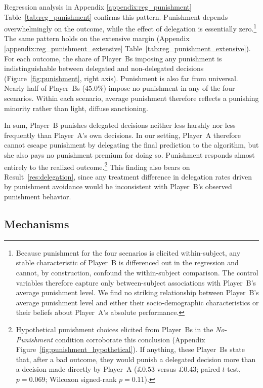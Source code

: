Regression analysis in Appendix \ref{appendix:reg_punishment} Table~\ref{tab:reg_punishment} confirms this pattern. Punishment depends overwhelmingly on the outcome, while the effect of delegation is essentially zero.\footnote{Because punishment for the four scenarios is elicited within-subject, any stable characteristic of Player~B is differenced out in the regression and cannot, by construction, confound the within-subject comparison. The control variables therefore capture only between-subject associations with Player~B's average punishment level. We find no striking relationship between Player~B's average punishment level and either their socio-demographic characteristics or their beliefs about Player~A's absolute performance.} The same pattern holds on the extensive margin (Appendix \ref{appendix:reg_punishment_extensive} Table~\ref{tab:reg_punishment_extensive}). For each outcome, the share of Player~Bs imposing any punishment is indistinguishable between delegated and non-delegated decisions (Figure~\ref{fig:punishment}, right axis). Punishment is also far from universal. Nearly half of Player~Bs ($45.0\%$) impose no punishment in any of the four scenarios. Within each scenario, average punishment therefore reflects a punishing minority rather than light, diffuse sanctioning.

In sum, Player~B punishes delegated decisions neither less harshly nor less frequently than Player~A's own decisions. In our setting, Player~A therefore cannot escape punishment by delegating the final prediction to the algorithm, but she also pays no punishment premium for doing so. Punishment responds almost entirely to the realized outcome.\footnote{Hypothetical punishment choices elicited from Player~Bs in the \textit{No-Punishment} condition corroborate this conclusion (Appendix Figure~\ref{fig:punishment_hypothetical}). If anything, these Player~Bs state that, after a bad outcome, they would punish a delegated decision more than a decision made directly by Player~A ($\pounds 0.53$ versus $\pounds 0.43$; paired $t$-test, $p=0.069$; Wilcoxon signed-rank $p=0.11$).} This finding also bears on Result~\ref{res:delegation}, since any treatment difference in delegation rates driven by punishment avoidance would be inconsistent with Player~B's observed punishment behavior.

\subsection*{Mechanisms} \label{sec:mechanism}

